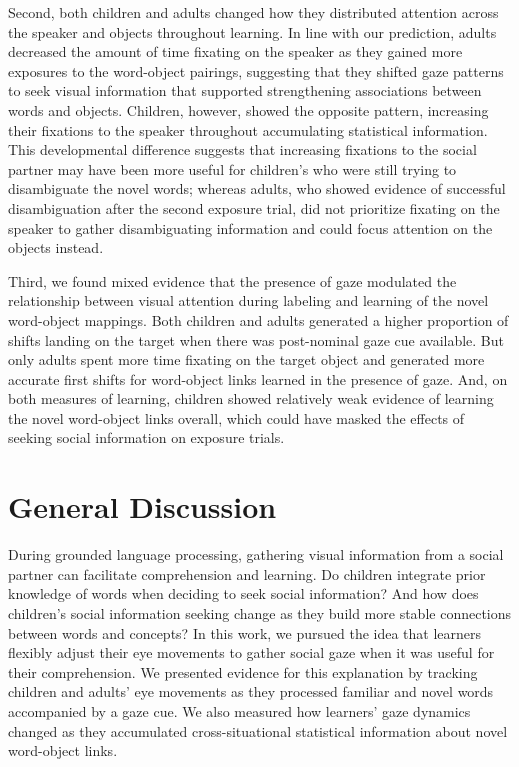 \documentclass[man,floatsintext]{apa6}
\begin{document}
Second, both children and adults changed how they distributed attention
across the speaker and objects throughout learning. In line with our
prediction, adults decreased the amount of time fixating on the speaker
as they gained more exposures to the word-object pairings, suggesting
that they shifted gaze patterns to seek visual information that
supported strengthening associations between words and objects.
Children, however, showed the opposite pattern, increasing their
fixations to the speaker throughout accumulating statistical
information. This developmental difference suggests that increasing
fixations to the social partner may have been more useful for children's
who were still trying to disambiguate the novel words; whereas adults,
who showed evidence of successful disambiguation after the second
exposure trial, did not prioritize fixating on the speaker to gather
disambiguating information and could focus attention on the objects
instead.

Third, we found mixed evidence that the presence of gaze modulated the
relationship between visual attention during labeling and learning of
the novel word-object mappings. Both children and adults generated a
higher proportion of shifts landing on the target when there was
post-nominal gaze cue available. But only adults spent more time
fixating on the target object and generated more accurate first shifts
for word-object links learned in the presence of gaze. And, on both
measures of learning, children showed relatively weak evidence of
learning the novel word-object links overall, which could have masked
the effects of seeking social information on exposure trials.

\section{General Discussion}\label{general-discussion}

During grounded language processing, gathering visual information from a
social partner can facilitate comprehension and learning. Do children
integrate prior knowledge of words when deciding to seek social
information? And how does children's social information seeking change
as they build more stable connections between words and concepts? In
this work, we pursued the idea that learners flexibly adjust their eye
movements to gather social gaze when it was useful for their
comprehension. We presented evidence for this explanation by tracking
children and adults' eye movements as they processed familiar and novel
words accompanied by a gaze cue. We also measured how learners' gaze
dynamics changed as they accumulated cross-situational statistical
information about novel word-object links.
\end{document}
